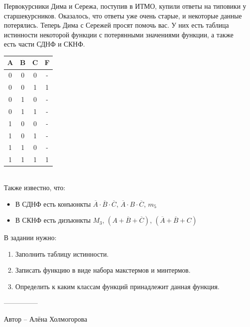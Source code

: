 \question
Первокурсники Дима и Сережа, поступив в ИТМО, купили ответы на типовики у старшекурсников. Оказалось, что ответы уже очень старые, и некоторые данные потерялись. Теперь Дима с Сережей просят помочь вас. У них есть таблица истинности некоторой функции с потерянными значениями функции, а также есть части СДНФ и СКНФ.
\\
\begin{tabular}{c|c|c||c|}
     \hline
     A & B & C & F \\
     \hline
     0 & 0 & 0 & - \\
     0 & 0 & 1 & 1 \\
     0 & 1 & 0 & - \\
     0 & 1 & 1 & - \\
     1 & 0 & 0 & - \\
     1 & 0 & 1 & - \\
     1 & 1 & 0 & - \\
     1 & 1 & 1 & 1 \\
\end{tabular}
\\
Также известно, что:
\begin{itemize}
    \item В СДНФ есть конъюнкты $\overline{A}\cdot\overline{B}\cdot\overline{C}$, $\overline{A}\cdot B\cdot\overline{C}$, $m_5$
    \item В СКНФ есть дизъюнкты $M_3$, $(A+\overline{B}+\overline{C})$, $(\overline{A}+\overline{B}+C)$
\end{itemize}
\par\medskip
В задании нужно:
\begin{enumerate}
    \item Заполнить таблицу истинности.
    \item Записать функцию в виде набора макстермов и минтермов.
    \item Определить к каким классам функций принадлежит данная функция.
\end{enumerate}
---------------

Автор -- Алёна Холмогорова